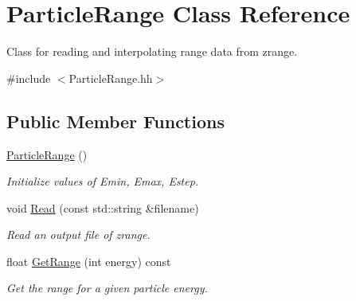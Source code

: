 \hypertarget{class_particle_range}{}\section{Particle\+Range Class Reference}
\label{class_particle_range}


Class for reading and interpolating range data from \textquotesingle{}zrange\textquotesingle{}.  




{\ttfamily \#include $<$Particle\+Range.\+hh$>$}

\subsection*{Public Member Functions}
\begin{DoxyCompactItemize}
\item 
\mbox{\label{class_particle_range_a4273029166d7a6220bfd1728b6c18f69}} 
\hyperlink{class_particle_range_a4273029166d7a6220bfd1728b6c18f69}{Particle\+Range} ()
\begin{DoxyCompactList}\small\item\em Initialize values of Emin, Emax, Estep. \end{DoxyCompactList}\item 
void \hyperlink{class_particle_range_ac1e0da5aca629369e93caf8e883da624}{Read} (const std\+::string \&filename)
\begin{DoxyCompactList}\small\item\em Read an output file of zrange. \end{DoxyCompactList}\item 
float \hyperlink{class_particle_range_a433dead3f85fe19ee1675934b65acf3f}{Get\+Range} (int energy) const
\begin{DoxyCompactList}\small\item\em Get the range for a given particle energy. \end{DoxyCompactList}\end{DoxyCompactItemize}
